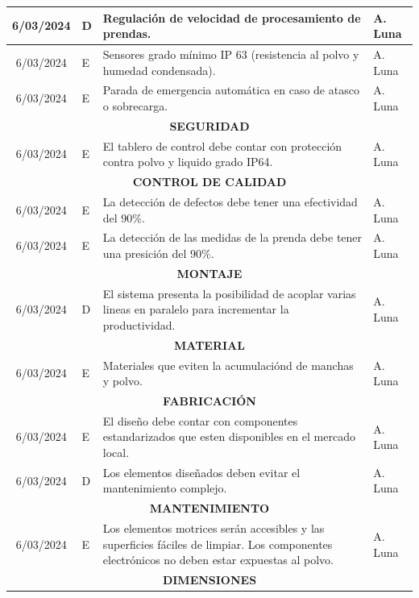 \begin{longtable}{|c|p{4.5em}|p{22.5em}|p{6em}|}
	\hline
	6/03/2024 & D     & Regulación de velocidad de procesamiento de prendas. & A. Luna \bigstrut\\
	\hline
	6/03/2024 & E     & Sensores grado mínimo IP 63 (resistencia al polvo y humedad condensada). & A. Luna \bigstrut\\
	\hline
	6/03/2024 & E     & Parada de emergencia automática en caso de atasco o sobrecarga. & A. Luna \bigstrut\\
	\hline
	\multicolumn{4}{|p{37.5em}|}{\textbf{SEGURIDAD}} \bigstrut\\
	\hline
	6/03/2024 & E     & El tablero de control debe contar con protección contra polvo y liquido grado IP64. & A. Luna \bigstrut\\
	\hline
	\multicolumn{4}{|p{37.5em}|}{\textbf{CONTROL DE CALIDAD}} \bigstrut\\
	\hline
	6/03/2024 & E     & La detección de defectos debe tener una efectividad del 90\%. & A. Luna \bigstrut\\
	\hline
	6/03/2024 & E     & La detección de las medidas de la prenda debe tener una presición del 90\%. & A. Luna \bigstrut\\
	\hline
	\multicolumn{4}{|p{37.5em}|}{\textbf{MONTAJE}} \bigstrut\\
	\hline
	6/03/2024 & D     & El sistema presenta la posibilidad de acoplar varias lineas en paralelo para incrementar la productividad. & A. Luna \bigstrut\\
	\hline
	\multicolumn{4}{|p{37.5em}|}{\textbf{MATERIAL}} \bigstrut\\
	\hline
	6/03/2024 & E     & Materiales que eviten la acumulaciónd de manchas y polvo. & A. Luna \bigstrut\\
	\hline
	\multicolumn{4}{|p{37.5em}|}{\textbf{FABRICACIÓN}} \bigstrut\\
	\hline
	6/03/2024 & E     & El diseño debe contar con componentes estandarizados que esten disponibles en el mercado local. & A. Luna \bigstrut\\
	\hline
	6/03/2024 & D     & Los elementos diseñados deben evitar el mantenimiento complejo. & A. Luna \bigstrut\\
	\hline
	\multicolumn{4}{|p{37.5em}|}{\textbf{MANTENIMIENTO}} \bigstrut\\
	\hline
	6/03/2024 & E     & Los elementos motrices serán accesibles y las superficies fáciles de limpiar. Los componentes electrónicos no deben estar expuestas al polvo. & A. Luna \bigstrut\\
	\hline
	\multicolumn{4}{|p{37.5em}|}{\textbf{DIMENSIONES}} \bigstrut\\

\end{longtable}
